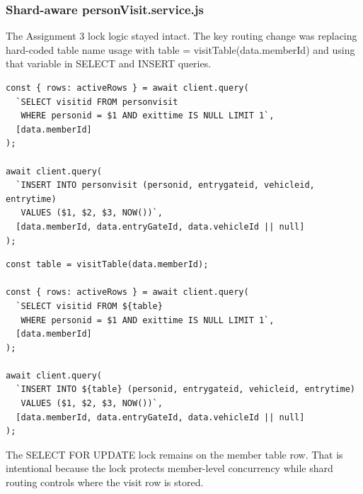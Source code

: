 \documentclass[a4paper,12pt]{article}
\begin{document}
\subsubsection{Shard-aware personVisit.service.js}

The Assignment 3 lock logic stayed intact. The key routing change was replacing hard-coded table name usage with table = visitTable(data.memberId) and using that variable in SELECT and INSERT queries.

\begin{minipage}[t]{0.48\textwidth}
\begin{lstlisting}[style=jsstyle,caption={Before (Assignment 3)}]
const { rows: activeRows } = await client.query(
  `SELECT visitid FROM personvisit
   WHERE personid = $1 AND exittime IS NULL LIMIT 1`,
  [data.memberId]
);

await client.query(
  `INSERT INTO personvisit (personid, entrygateid, vehicleid, entrytime)
   VALUES ($1, $2, $3, NOW())`,
  [data.memberId, data.entryGateId, data.vehicleId || null]
);
\end{lstlisting}
\end{minipage}
\hfill
\begin{minipage}[t]{0.48\textwidth}
\begin{lstlisting}[style=jsstyle,caption={After (Assignment 4)}]
const table = visitTable(data.memberId);

const { rows: activeRows } = await client.query(
  `SELECT visitid FROM ${table}
   WHERE personid = $1 AND exittime IS NULL LIMIT 1`,
  [data.memberId]
);

await client.query(
  `INSERT INTO ${table} (personid, entrygateid, vehicleid, entrytime)
   VALUES ($1, $2, $3, NOW())`,
  [data.memberId, data.entryGateId, data.vehicleId || null]
);
\end{lstlisting}
\end{minipage}

\begin{tcolorbox}[warnbox]
The SELECT FOR UPDATE lock remains on the member table row. That is intentional because the lock protects member-level concurrency while shard routing controls where the visit row is stored.
\end{tcolorbox}
\end{document}
